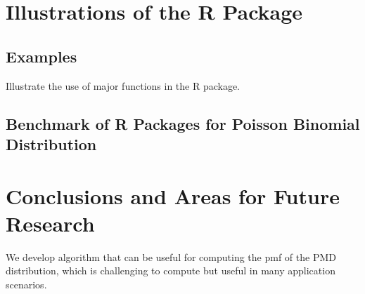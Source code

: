 \documentclass[12pt]{article}
\begin{document}
\section{Illustrations of the R Package}
\subsection{Examples}
Illustrate the use of major functions in the R package.


\subsection{Benchmark of R Packages for Poisson Binomial Distribution}



\section{Conclusions and Areas for Future Research}

We develop algorithm that can be useful for computing the pmf of the PMD distribution, which is challenging to compute but useful in many application scenarios.





	


%



	
\end{document}
